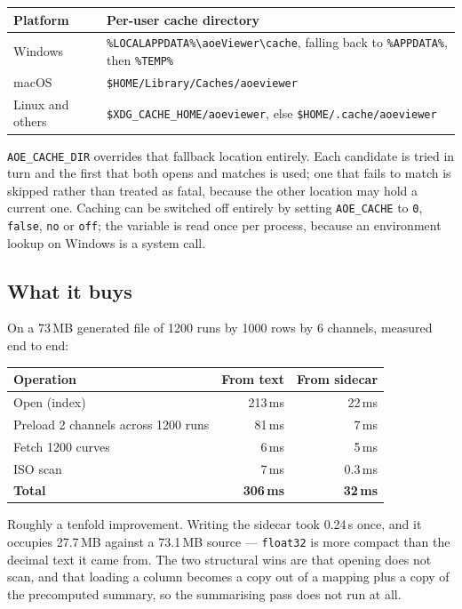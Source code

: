 \documentclass[11pt,a4paper,oneside]{report}
\newcommand{\code}[1]{\texttt{#1}}
\begin{document}
\begin{center}
\small
\begin{tabular}{@{}p{}p{}@{}}
\toprule
\textbf{Platform} & \textbf{Per-user cache directory} \\
\midrule
Windows & \code{\%LOCALAPPDATA\%\textbackslash aoeViewer\textbackslash cache}, falling back to \code{\%APPDATA\%}, then \code{\%TEMP\%} \\
macOS & \code{\$HOME/Library/Caches/aoeviewer} \\
Linux and others & \code{\$XDG\_CACHE\_HOME/aoeviewer}, else \code{\$HOME/.cache/aoeviewer} \\
\bottomrule
\end{tabular}
\end{center}

\code{AOE\_CACHE\_DIR} overrides that fallback location entirely. Each candidate
is tried in turn and the first that both opens and matches is used; one that
fails to match is skipped rather than treated as fatal, because the other
location may hold a current one. Caching can be switched off entirely by setting
\code{AOE\_CACHE} to \code{0}, \code{false}, \code{no} or \code{off}; the
variable is read once per process, because an environment lookup on Windows is a
system call.

\subsection{What it buys}

On a 73\,MB generated file of 1200 runs by 1000 rows by 6 channels, measured end
to end:

\begin{center}
\small
\begin{tabular}{@{}lrr@{}}
\toprule
\textbf{Operation} & \textbf{From text} & \textbf{From sidecar} \\
\midrule
Open (index) & 213\,ms & 22\,ms \\
Preload 2 channels across 1200 runs & 81\,ms & 7\,ms \\
Fetch 1200 curves & 6\,ms & 5\,ms \\
ISO scan & 7\,ms & 0.3\,ms \\
\midrule
\textbf{Total} & \textbf{306\,ms} & \textbf{32\,ms} \\
\bottomrule
\end{tabular}
\end{center}

Roughly a tenfold improvement. Writing the sidecar took 0.24\,s once, and it
occupies 27.7\,MB against a 73.1\,MB source --- \code{float32} is more compact
than the decimal text it came from. The two structural wins are that opening does
not scan, and that loading a column becomes a copy out of a mapping plus a copy
of the precomputed summary, so the summarising pass does not run at all.
\end{document}

